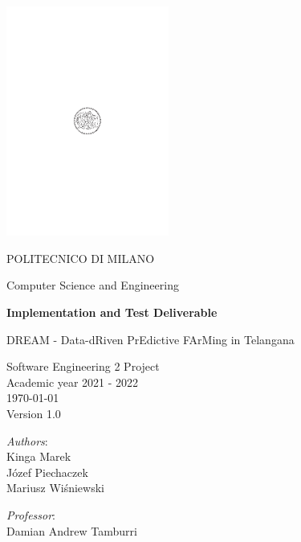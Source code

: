 \begin{titlingpage}
	\begin{center}
		\includegraphics[width=0.4\textwidth]{title_page/logo_polimi}
		
		\vspace{0.25cm}
		
		\LARGE POLITECNICO DI MILANO\\
		
		\vspace{0.2cm}
		
		\Large Computer Science and Engineering
		
		\vspace{0.8cm}
	
		\Huge \textbf{Implementation and Test Deliverable}
		
		\vspace{0.5cm}
		\huge DREAM - Data-dRiven PrEdictive FArMing in Telangana
		
		\vspace{1.5cm}
		\LARGE Software Engineering 2 Project\\
		\Large Academic year 2021 - 2022\\
		\vspace{1cm}
		\today\\
		Version 1.0
		\vspace{1cm}
		
		\large
		\begin{minipage}{.1\textwidth}
			\null
		\end{minipage}%
		\begin{minipage}{.4\textwidth}
			\textit{Authors}:\\
			Kinga Marek\\
            Józef Piechaczek\\
			Mariusz Wiśniewski
		\end{minipage}%
		\begin{minipage}{.4\textwidth}
			\raggedleft	
			\textit{Professor}:\\
			Damian Andrew Tamburri\\
			\phantom{placeholder}
		\end{minipage}%
		\begin{minipage}{.1\textwidth}
			\null
		\end{minipage}
		\end{center}
\end{titlingpage}